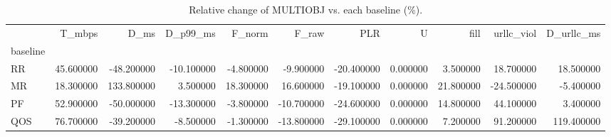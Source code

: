 \begin{table}
\caption{Relative change of MULTIOBJ vs. each baseline (\%).}
\label{tab:pct}
\begin{tabular}{lrrrrrrrrrr}
\toprule
 & T_mbps & D_ms & D_p99_ms & F_norm & F_raw & PLR & U & fill & urllc_viol & D_urllc_ms \\
baseline &  &  &  &  &  &  &  &  &  &  \\
\midrule
RR & 45.600000 & -48.200000 & -10.100000 & -4.800000 & -9.900000 & -20.400000 & 0.000000 & 3.500000 & 18.700000 & 18.500000 \\
MR & 18.300000 & 133.800000 & 3.500000 & 18.300000 & 16.600000 & -19.100000 & 0.000000 & 21.800000 & -24.500000 & -5.400000 \\
PF & 52.900000 & -50.000000 & -13.300000 & -3.800000 & -10.700000 & -24.600000 & 0.000000 & 14.800000 & 44.100000 & 3.400000 \\
QOS & 76.700000 & -39.200000 & -8.500000 & -1.300000 & -13.800000 & -29.100000 & 0.000000 & 7.200000 & 91.200000 & 119.400000 \\
\bottomrule
\end{tabular}
\end{table}
